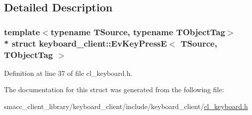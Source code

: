 \subsection{Detailed Description}
\subsubsection*{template$<$typename T\+Source, typename T\+Object\+Tag$>$\\*
struct keyboard\+\_\+client\+::\+Ev\+Key\+Press\+E$<$ T\+Source, T\+Object\+Tag $>$}



Definition at line 37 of file cl\+\_\+keyboard.\+h.



The documentation for this struct was generated from the following file\+:\begin{DoxyCompactItemize}
\item 
smacc\+\_\+client\+\_\+library/keyboard\+\_\+client/include/keyboard\+\_\+client/\hyperlink{cl__keyboard_8h}{cl\+\_\+keyboard.\+h}\end{DoxyCompactItemize}
